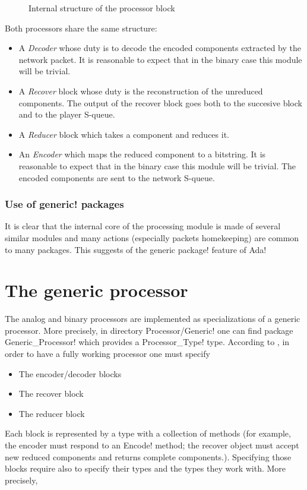 \documentclass{medusabook}
\begin{document}
\begin{figure}
\centerline{}
\caption{Internal structure of the processor block
\label{fig:processor-structure}}
\end{figure}
%
Both processors share the same structure: 
\begin{itemize}
  \item A \emph{Decoder} whose duty is to decode the encoded
  components extracted by the network packet.  It is reasonable to
  expect that in the binary case this module will be trivial.
  \item A \emph{Recover} block whose
   duty is the reconstruction of the unreduced components. The output
   of the recover block goes both to the succesive block and to the
   player S-queue.
  \item A \emph{Reducer} block which takes a component and reduces
  it. 
  \item An \emph{Encoder} which maps the reduced component to a
  bitstring. It is reasonable to expect that in the binary case this
  module will be trivial.  The encoded components are sent to the
  network S-queue.
\end{itemize}

\subsection{Use of \ttt generic! packages}
\label{sub:0.1.2;dsp_book}

It is clear that the internal core of the processing module is made of
several similar modules and many actions (especially packets
homekeeping) are common to many packages.  This suggests of the \ttt
generic package! feature of \ttt Ada!

\chapter{The generic processor}

The analog and binary processors are implemented as specializations of
a generic processor.  More precisely, in directory  \ttt Processor/Generic!
one can find package \ttt Generic\_Processor! which provides a \ttt
Processor\_Type! type.  According to , in
order to have a fully working processor one must specify

\begin{itemize}
\item
The encoder/decoder blocks
\item
The recover block
\item
The reducer block
\end{itemize}
%
Each block is represented by a type with a collection of methods (for
example, the encoder must respond to an \ttt Encode!  method; the
recover object must accept new reduced components and returns complete
components.).  Specifying those blocks require also to specify their
types and the types they work with.  More precisely,
\end{document}
